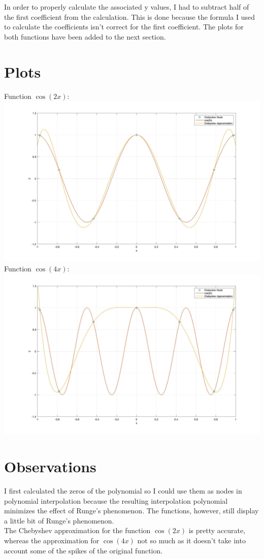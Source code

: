 \documentclass{article}
\begin{document}
In order to properly calculate the associated y values, I had to subtract half of the first coefficient from the calculation. This is done because the formula I used to calculate the coefficients isn't correct for the first coefficient. The plots for both functions have been added to the next section.\\

\section{Plots}
Function $\cos(2x)$:\\
\includegraphics[width=\textwidth,height=\textheight,keepaspectratio]{cos2x.jpg}\\
Function $\cos(4x)$:\\
\includegraphics[width=\textwidth,height=\textheight,keepaspectratio]{cos4x.jpg}
\section{Observations}
I first calculated the zeros of the polynomial so I could use them as nodes in polynomial interpolation because the resulting interpolation polynomial minimizes the effect of Runge's phenomenon. The functions, however, still display a little bit of Runge's phenomenon. \\

The Chebyshev approximation for the function $\cos(2x)$ is pretty accurate, whereas the approximation for $\cos(4x)$ not so much as it doesn't take into account some of the spikes of the original function.
\end{document}
